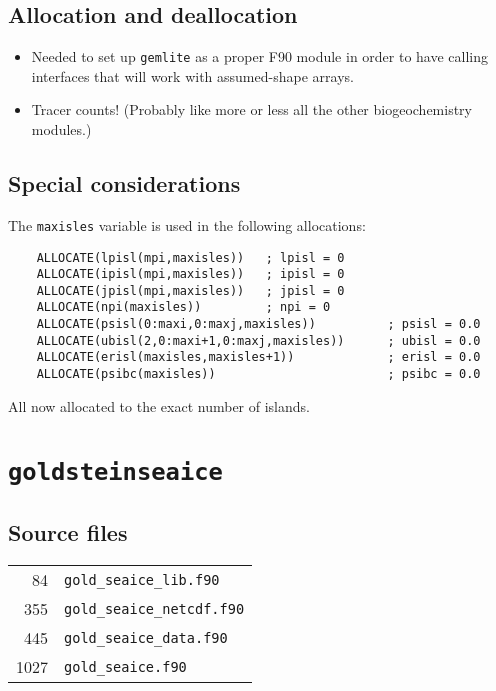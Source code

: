 \documentclass[a4paper,10pt,article]{memoir}
\begin{document}
\section{Allocation and deallocation}

\begin{itemize}
  \item{Needed to set up \texttt{gemlite} as a proper F90 module in
    order to have calling interfaces that will work with assumed-shape
    arrays.}
  \item{Tracer counts!  (Probably like more or less all the other
    biogeochemistry modules.)}
\end{itemize}

\section{Special considerations}

The \texttt{maxisles} variable is used in the following allocations:

\begin{verbatim}
    ALLOCATE(lpisl(mpi,maxisles))   ; lpisl = 0
    ALLOCATE(ipisl(mpi,maxisles))   ; ipisl = 0
    ALLOCATE(jpisl(mpi,maxisles))   ; jpisl = 0
    ALLOCATE(npi(maxisles))         ; npi = 0
    ALLOCATE(psisl(0:maxi,0:maxj,maxisles))          ; psisl = 0.0
    ALLOCATE(ubisl(2,0:maxi+1,0:maxj,maxisles))      ; ubisl = 0.0
    ALLOCATE(erisl(maxisles,maxisles+1))             ; erisl = 0.0
    ALLOCATE(psibc(maxisles))                        ; psibc = 0.0
\end{verbatim}

All now allocated to the exact number of islands.

\chapter{\texttt{goldsteinseaice}}

\section{Source files}

\begin{tabular}{rl}
   84 & \texttt{gold\_seaice\_lib.f90} \\
  355 & \texttt{gold\_seaice\_netcdf.f90} \\
  445 & \texttt{gold\_seaice\_data.f90} \\
 1027 & \texttt{gold\_seaice.f90} \\
\end{tabular}
\end{document}
